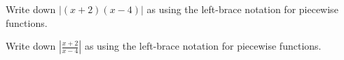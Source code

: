\documentclass[../main.tex]{subfiles}
\begin{document}


\begin{exercise} \label{ex:piecewise-abs-of-function}
  Write down \(|(x + 2)(x - 4)|\) as using the left-brace notation for piecewise functions.

  \blanks*
\end{exercise}
\clearpage

\begin{exercise}
  Write down \(\left| \frac{x + 2}{x - 4} \right|\) as using the left-brace notation for piecewise functions.

  \blanks*
\end{exercise}
\clearpage
\end{document}
